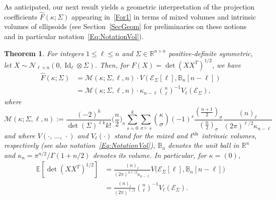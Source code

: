 \documentclass[10pt]{amsart}
\newtheorem{theo}{Theorem}[section]
\theoremstyle{definition}\newtheorem{defi}[theo]{Definition}\newtheorem{rema}[theo]{Remark}\newtheorem{exam}[theo]{Example}\newtheorem{exem}[theo]{Example}\newtheorem{nota}[theo]{Notation}
\DeclareMathOperator{\Id}{Id}
\newcommand{\scN}{\mathscr{N}}
\newcommand{\clM}{\mathcal{M}}
\newcommand{\clE}{\mathcal{E}}
\newcommand{\R}{\mathbb{R}}
\newcommand{\bbB}{\mathbb{B}}
\newcommand{\E}[1]{\mathbb{E}\left[#1\right]}
\begin{document}
As anticipated, our next result yields a geometric interpretation of the projection coefficients $\widehat{F}(\kappa;\Sigma)$ appearing in~\eqref{For1} in terms of mixed volumes and intrinsic volumes of ellipsoids (see Section~\ref{SecGeom} for preliminaries on these notions and in particular notation~\eqref{Eq:NotationVol}).

\begin{theo}\label{InterVol}
For integers $1\leq \ell \leq n$ and $\Sigma \in \R^{n\times n}$ positive-definite symmetric, let $X \sim \scN_{\ell \times n}(0,\Id_{\ell}\otimes \Sigma)$. Then, for $F(X)=\det(XX^T)^{1/2}$, we have
\begin{align}
\widehat{F}(\kappa;\Sigma) &=
\clM(\kappa;\Sigma, \ell,n)\cdot V(\clE_{\Sigma}[\ell],\bbB_n[n-\ell]) \label{For2}
\\
&= \clM(\kappa;\Sigma,\ell,n)\cdot
\kappa_{n-\ell}\binom{ n}{\ell}^{-1} V_{\ell}(\clE_{\Sigma}), \label{For3}
\end{align}
where
\[
\clM(\kappa;\Sigma, \ell,n):=
\frac{ (-2)^{k} }{\det(\Sigma)^{\ell k} k!}\bigg(\frac{n}{2}\bigg)_{\kappa}
\sum_{s=0}^{k} \sum_{\sigma \vdash s} \binom{\kappa}{\sigma} (-1)^s\frac{\left(\frac{n+1}{2}\right)_{\sigma}}{\left(\frac{n}{2}\right)_{\sigma}}
\frac{(n)_{\ell} }{(2\pi)^{\ell/2} \kappa_{n-\ell}}
\]
and where $V(\cdot,\,\ldots,\,\cdot)$ and $V_{\ell}(\cdot)$ stand for the mixed and $\ell^{\rm th}$ intrinsic volumes, respectively (see also notation~\eqref{Eq:NotationVol}), $\bbB_n$ denotes the unit ball in $\R^n$ and $\kappa_n=\pi^{n/2}/\Gamma(1+n/2)$ denotes its volume. In particular, for $\kappa=(0)$,
\begin{equation}\label{Kab}
\begin{split}
\E{\det\left(XX^T\right)^{1/2}} &=
\frac{(n)_{\ell}}{(2\pi)^{n\ell/2}\kappa_{n-\ell}}V\big(\clE_{\Sigma}[\ell],\bbB_n[n-\ell]\big)\\
&= \frac{(n)_{\ell} }{(2\pi)^{\ell/2} }\binom{ n}{\ell}^{-1} V_{\ell}(\clE_{\Sigma}).
\end{split}
\end{equation}
\end{theo}
\end{document}
